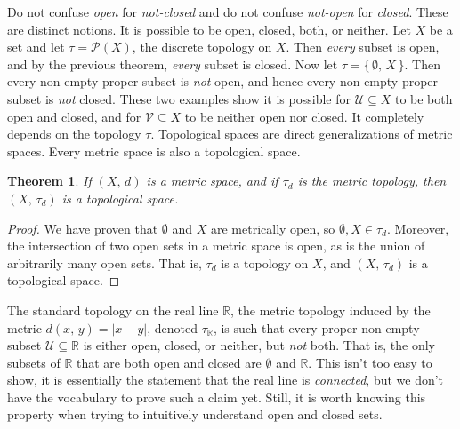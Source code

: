 \documentclass{article}
\theoremstyle{plain}
\newtheorem{theorem}{Theorem}[section]
\theoremstyle{normal}
\newenvironment{example}{%
    \pushQED{\qed}\renewcommand{\qedsymbol}{$\blacksquare$}\examplex%
}{%
    \popQED\endexamplex%
}
\begin{document}
    \begin{example}
        Do not confuse \textit{open} for \textit{not-closed} and do not confuse
        \textit{not-open} for \textit{closed}. These are distinct notions.
        It is possible to be open, closed, both, or neither. Let $X$ be a set
        and let $\tau=\mathcal{P}(X)$, the discrete topology on $X$. Then
        \textit{every} subset is open, and by the previous theorem,
        \textit{every} subset is closed. Now let
        $\tau=\{\,\emptyset,\,X\,\}$. Then every non-empty proper
        subset is \textit{not} open, and hence every non-empty proper subset is
        \textit{not} closed. These two examples show it is possible for
        $\mathcal{U}\subseteq{X}$ to be both open and closed, and for
        $\mathcal{V}\subseteq{X}$ to be neither open nor closed. It completely
        depends on the topology $\tau$. 
    \end{example}
    Topological spaces are direct generalizations of metric spaces. Every
    metric space is also a topological space.
    \begin{theorem}
        If $(X,\,d)$ is a metric space, and if $\tau_{d}$ is the metric
        topology, then $(X,\,\tau_{d})$ is a topological space.
    \end{theorem}
    \begin{proof}
        We have proven that $\emptyset$ and $X$ are metrically open, so
        $\emptyset,X\in\tau_{d}$. Moreover, the intersection of two
        open sets in a metric space is open, as is the union of arbitrarily
        many open sets. That is, $\tau_{d}$ is a topology on $X$, and
        $(X,\,\tau_{d})$ is a topological space.
    \end{proof}
    \begin{example}
        The standard topology on the real line $\mathbb{R}$, the metric topology
        induced by the metric $d(x,\,y)=|x-y|$, denoted $\tau_{\mathbb{R}}$,
        is such that every proper non-empty subset
        $\mathcal{U}\subseteq\mathbb{R}$ is either open, closed, or neither,
        but \textit{not} both. That is, the only subsets of $\mathbb{R}$ that
        are both open and closed are $\emptyset$ and $\mathbb{R}$. This isn't
        too easy to show, it is essentially the statement that the real line
        is \textit{connected}, but we don't have the vocabulary to prove such
        a claim yet. Still, it is worth knowing this property when trying to
        intuitively understand open and closed sets.
    \end{example}
\end{document}
